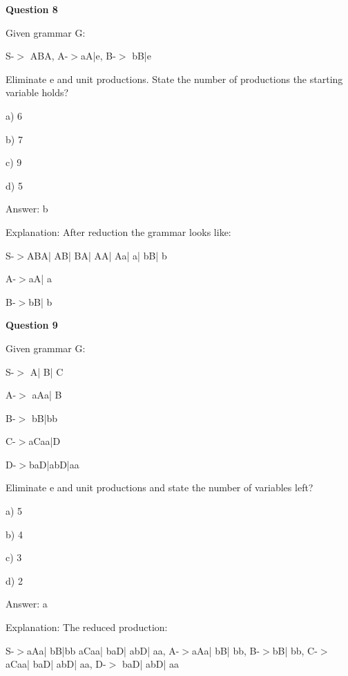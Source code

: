 \documentclass{article}
\begin{document}
\begin{mdframed}[linewidth=1pt, roundcorner=5pt, linecolor=gray!30, backgroundcolor=gray!5]
\textbf{Question 8} 

Given grammar G:

S-$>$ ABA, A-$>$aA|e, B-$>$ bB|e

Eliminate e and unit productions. State the number of productions the starting variable holds?

a) 6

b) 7

c) 9

d) 5
\vspace{5pt} \par
\begin{tcolorbox}[colback=green!5, colframe=green!40!black, title=Solution]
Answer: b

Explanation: After reduction the grammar looks like:

S-$>$ABA| AB| BA| AA| Aa| a| bB| b

A-$>$aA| a

B-$>$bB| b
\end{tcolorbox}
\end{mdframed}

\begin{mdframed}[linewidth=1pt, roundcorner=5pt, linecolor=gray!30, backgroundcolor=gray!5]
\textbf{Question 9} 

Given grammar G:

S-$>$ A| B| C

A-$>$ aAa| B

B-$>$ bB|bb

C-$>$aCaa|D

D-$>$baD|abD|aa

Eliminate e and unit productions and state the number of variables left?

a) 5

b) 4

c) 3

d) 2
\vspace{5pt} \par
\begin{tcolorbox}[colback=green!5, colframe=green!40!black, title=Solution]
Answer: a

Explanation: The reduced production:

 S-$>$aAa| bB|bb aCaa| baD| abD| aa, A-$>$aAa| bB| bb, B-$>$bB| bb, C-$>$aCaa| baD| abD| aa, D-$>$ baD| abD| aa
\end{tcolorbox}
\end{mdframed}
\newpage
\end{document}
